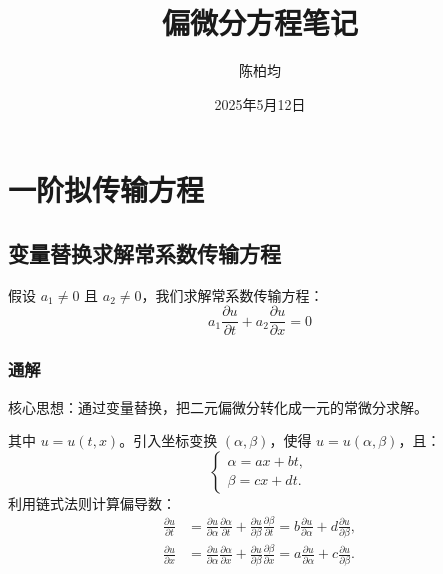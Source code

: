 \documentclass[12pt,a4paper]{article}
\title{偏微分方程笔记}
\author{陈柏均}
\date{2025年5月12日}
\numberwithin{subsection}{section}   %
\numberwithin{subsubsection}{subsection}
\theoremstyle{plain}
\theoremstyle{definition}
\theoremstyle{remark}
\theoremstyle{verification}
\begin{document}
	
	\maketitle
	
	\tableofcontents  %
	
	\section{一阶拟传输方程} 
	\subsection{变量替换求解常系数传输方程} 
	
	
	
	假设 $a_1 \neq 0$ 且 $a_2 \neq 0$，我们求解常系数传输方程：
	\begin{equation} \label{eq:pde_original}
		a_1 \frac{\partial u}{\partial t} + a_2 \frac{\partial u}{\partial x} = 0
	\end{equation}
	
	\subsubsection{通解} 
	核心思想：通过变量替换，把二元偏微分转化成一元的常微分求解。
	
	其中 $u = u(t,x)$。引入坐标变换 $(\alpha, \beta)$，使得 $u = u(\alpha, \beta)$，且：
	\begin{equation} \label{eq:coordinate_transform}
		\begin{cases}
			\alpha = ax + bt, \\
			\beta = cx + dt.
		\end{cases}
	\end{equation}
	利用链式法则计算偏导数：
	\begin{align}
		\frac{\partial u}{\partial t} 
		&= \frac{\partial u}{\partial \alpha} \frac{\partial \alpha}{\partial t} + \frac{\partial u}{\partial \beta} \frac{\partial \beta}{\partial t} 
		= b\frac{\partial u}{\partial \alpha} + d\frac{\partial u}{\partial \beta}, \label{eq:u_t_chain_rule} \\
		\frac{\partial u}{\partial x} 
		&= \frac{\partial u}{\partial \alpha} \frac{\partial \alpha}{\partial x} + \frac{\partial u}{\partial \beta} \frac{\partial \beta}{\partial x} 
		= a\frac{\partial u}{\partial \alpha} + c\frac{\partial u}{\partial \beta}. \label{eq:u_x_chain_rule}
	\end{align}
	
\end{document}
